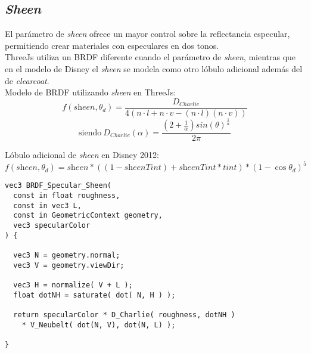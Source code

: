   \subsection*{\textit{Sheen}}
  El par\'ametro de \textit{sheen} ofrece un mayor control sobre la reflectancia especular, permitiendo crear materiales con
  especulares en dos tonos.\\

  ThreeJs utiliza un BRDF diferente cuando el par\'ametro de \textit{sheen}, mientras que en el modelo de Disney el \textit{sheen}
  se modela como otro l\'obulo adicional adem\'as del de \textit{clearcoat}.\\

  Modelo de BRDF utilizando \textit{sheen} en ThreeJs: \\

  $$
  f(\textit{sheen}, \theta_d) =\frac{D_{Charlie}}{4(n\cdot{l} + n\cdot{v} - (n\cdot{l})(n\cdot{v}) )}
  $$
  \begin{equation}
    \textrm{siendo}\ D_{Charlie}(\alpha) = \frac
    {(2 + \frac{1}{\alpha})sin(\theta)^\frac{1}{\alpha}}
    {2\pi}
  \end{equation}
  \singlespacing

  L\'obulo adicional de \textit{sheen} en Disney 2012:\\

  \begin{equation}
    f(\textit{sheen}, \theta_d) = \textit{sheen} * ((1 - \textit{sheenTint}) + \textit{sheenTint} * \textit{tint}) * (1 - \cos\theta_d)^5
  \end{equation}
  \singlespacing

  \begin{lstlisting}[caption={BRDF del modelo de \textit{sheen} de ThreeJs}]
vec3 BRDF_Specular_Sheen(
  const in float roughness,
  const in vec3 L,
  const in GeometricContext geometry,
  vec3 specularColor
) {

  vec3 N = geometry.normal;
  vec3 V = geometry.viewDir;

  vec3 H = normalize( V + L );
  float dotNH = saturate( dot( N, H ) );

  return specularColor * D_Charlie( roughness, dotNH )
    * V_Neubelt( dot(N, V), dot(N, L) );

}
  \end{lstlisting}